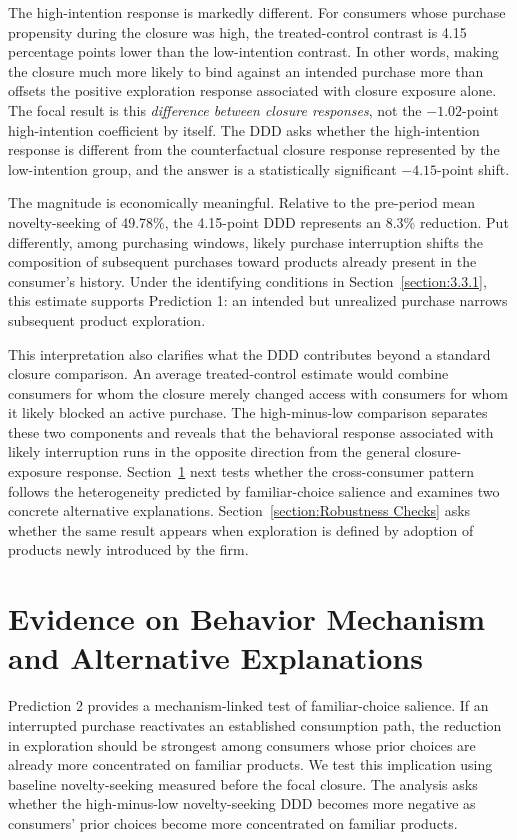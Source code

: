 \documentclass[11 pt]{article}
\begin{document}
The high-intention response is markedly different. For consumers whose purchase propensity during the closure was high, the treated-control contrast is 4.15 percentage points lower than the low-intention contrast. In other words, making the closure much more likely to bind against an intended purchase more than offsets the positive exploration response associated with closure exposure alone. The focal result is this \textit{difference between closure responses}, not the $-1.02$-point high-intention coefficient by itself. The DDD asks whether the high-intention response is different from the counterfactual closure response represented by the low-intention group, and the answer is a statistically significant $-4.15$-point shift.

The magnitude is economically meaningful. Relative to the pre-period mean novelty-seeking of 49.78\%, the 4.15-point DDD represents an 8.3\% reduction. Put differently, among purchasing windows, likely purchase interruption shifts the composition of subsequent purchases toward products already present in the consumer's history. Under the identifying conditions in Section~\ref{section:3.3.1}, this estimate supports Prediction 1: an intended but unrealized purchase narrows subsequent product exploration.

This interpretation also clarifies what the DDD contributes beyond a standard closure comparison. An average treated-control estimate would combine consumers for whom the closure merely changed access with consumers for whom it likely blocked an active purchase. The high-minus-low comparison separates these two components and reveals that the behavioral response associated with likely interruption runs in the opposite direction from the general closure-exposure response. Section~\ref{section:Mechanisms} next tests whether the cross-consumer pattern follows the heterogeneity predicted by familiar-choice salience and examines two concrete alternative explanations. Section~\ref{section:Robustness Checks} asks whether the same result appears when exploration is defined by adoption of products newly introduced by the firm.


\section{Evidence on Behavior Mechanism and Alternative Explanations}
\label{section:Mechanisms}

Prediction 2 provides a mechanism-linked test of familiar-choice salience. If an interrupted purchase reactivates an established consumption path, the reduction in exploration should be strongest among consumers whose prior choices are already more concentrated on familiar products. We test this implication using baseline novelty-seeking measured before the focal closure. The analysis asks whether the high-minus-low novelty-seeking DDD becomes more negative as consumers' prior choices become more concentrated on familiar products.
\end{document}
